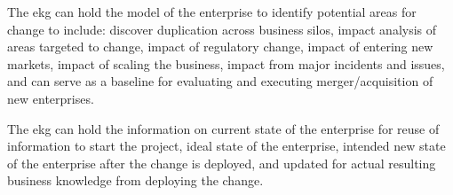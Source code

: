 %
%
The \gls{ekg} can hold the model of the enterprise to identify potential areas for change to include:
discover duplication across business silos, impact analysis of areas targeted to change,
impact of regulatory change, impact of entering new markets, impact of scaling the business,
impact from major incidents and issues, and can serve as a baseline for evaluating and executing
merger/acquisition of new enterprises.

The \gls{ekg} can hold the information on current state of the enterprise for reuse of information to start the
project, ideal state of the enterprise, intended new state of the enterprise after the change is deployed,
and updated for actual resulting business knowledge from deploying the change.